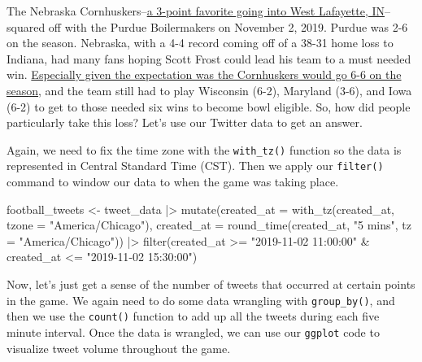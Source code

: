 \documentclass[
  letterpaper,
  DIV=11,
  numbers=noendperiod]{scrreprt}
\newenvironment{Shaded}{\begin{snugshade}}{\end{snugshade}}
\newcommand{\AttributeTok}[1]{\textcolor[rgb]{0.40,0.45,0.13}{#1}}
\newcommand{\FunctionTok}[1]{\textcolor[rgb]{0.28,0.35,0.67}{#1}}
\newcommand{\NormalTok}[1]{\textcolor[rgb]{0.00,0.23,0.31}{#1}}
\newcommand{\OtherTok}[1]{\textcolor[rgb]{0.00,0.23,0.31}{#1}}
\newcommand{\SpecialCharTok}[1]{\textcolor[rgb]{0.37,0.37,0.37}{#1}}
\newcommand{\StringTok}[1]{\textcolor[rgb]{0.13,0.47,0.30}{#1}}
\begin{document}
The Nebraska
Cornhuskers--\href{https://nebraska.rivals.com/news/nebraska-at-purdue-keys-to-victory-hol-score-predictions}{a
3-point favorite going into West Lafayette, IN}--squared off with the
Purdue Boilermakers on November 2, 2019. Purdue was 2-6 on the season.
Nebraska, with a 4-4 record coming off of a 38-31 home loss to Indiana,
had many fans hoping Scott Frost could lead his team to a must needed
win.
\href{https://journalstar.com/sports/huskers/sipple/steven-m-sipple-frost-s-reaction-to-moos-six-win/article_bcebc067-865e-59a7-948d-c99290201294.html}{Especially
given the expectation was the Cornhuskers would go 6-6 on the season},
and the team still had to play Wisconsin (6-2), Maryland (3-6), and Iowa
(6-2) to get to those needed six wins to become bowl eligible. So, how
did people particularly take this loss? Let's use our Twitter data to
get an answer.

Again, we need to fix the time zone with the \texttt{with\_tz()}
function so the data is represented in Central Standard Time (CST). Then
we apply our \texttt{filter()} command to window our data to when the
game was taking place.

\begin{Shaded}
\begin{Highlighting}[]
\NormalTok{football\_tweets }\OtherTok{\textless{}{-}}\NormalTok{ tweet\_data }\SpecialCharTok{|\textgreater{}}
  \FunctionTok{mutate}\NormalTok{(}\AttributeTok{created\_at =} \FunctionTok{with\_tz}\NormalTok{(created\_at, }\AttributeTok{tzone =} \StringTok{"America/Chicago"}\NormalTok{),}
         \AttributeTok{created\_at =} \FunctionTok{round\_time}\NormalTok{(created\_at, }\StringTok{"5 mins"}\NormalTok{, }\AttributeTok{tz =} \StringTok{"America/Chicago"}\NormalTok{)) }\SpecialCharTok{|\textgreater{}} 
  \FunctionTok{filter}\NormalTok{(created\_at }\SpecialCharTok{\textgreater{}=} \StringTok{"2019{-}11{-}02 11:00:00"} \SpecialCharTok{\&}\NormalTok{ created\_at }\SpecialCharTok{\textless{}=} \StringTok{"2019{-}11{-}02 15:30:00"}\NormalTok{) }
\end{Highlighting}
\end{Shaded}

Now, let's just get a sense of the number of tweets that occurred at
certain points in the game. We again need to do some data wrangling with
\texttt{group\_by()}, and then we use the \texttt{count()} function to
add up all the tweets during each five minute interval. Once the data is
wrangled, we can use our \texttt{ggplot} code to visualize tweet volume
throughout the game.
\end{document}
